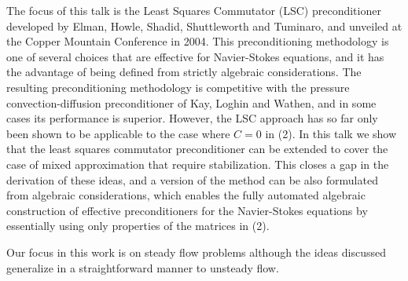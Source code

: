 \documentclass{report}
\begin{document}
The focus of this talk is the Least Squares
Commutator (LSC) preconditioner developed by Elman, Howle,
Shadid, Shuttleworth and Tuminaro, and unveiled at the
Copper Mountain Conference in 2004. This preconditioning
methodology is one of several choices that are effective for
Navier-Stokes equations, and it has the advantage of being
defined from strictly algebraic considerations. The
resulting preconditioning methodology is competitive with
the pressure convection-diffusion preconditioner of Kay,
Loghin and Wathen, and in some cases its performance is
superior. However, the LSC approach has so far only been
shown to be applicable to the case where $C=0$ in
(2). In this talk we show
that the least squares commutator preconditioner can be
extended to cover the case of mixed approximation that
require stabilization. This closes a gap in the derivation
of these ideas, and a version of the method can be also
formulated from algebraic considerations, which enables the
fully automated algebraic construction of effective
preconditioners for the Navier-Stokes equations by
essentially using only properties of the matrices in
(2).

Our focus in this
work is on steady flow problems although the ideas discussed
generalize in a straightforward manner to unsteady flow.


\end{document}
